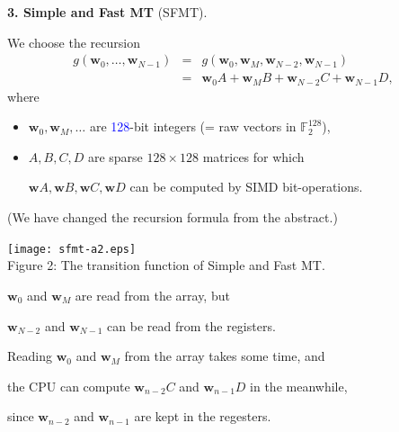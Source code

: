 \documentclass[a4j,12pt,landscape]{jarticle}
\def\F2{{\mathbb F}_2}
\def\bw{{{\mathbf w}}}
\begin{document}
\newpage
\noindent
{\bf 3. Simple and Fast MT} (SFMT).

We choose the recursion
\begin{eqnarray*}
g(\bw_0,\ldots,\bw_{N-1}) &=& g(\bw_0, \bw_M, \bw_{N-2}, \bw_{N-1}) \\
&=& \bw_0A + \bw_MB + \bw_{N-2}C + \bw_{N-1}D,
\end{eqnarray*}
where 
\begin{itemize}
\item
$\bw_0, \bw_M, \ldots$ are \textcolor{blue}{128}-bit integers 
(= raw vectors in $\F2^{128}$),

\item
$A, B, C, D$ are sparse $128 \times 128$ matrices
for which 

$\bw A, \bw B, \bw C, \bw D$ can be computed by
SIMD bit-operations.
\end{itemize}

(We have changed the recursion formula from the abstract.)
\newpage
\begin{center}
\texttt{[image: sfmt-a2.eps]}
\\
Figure 2: The transition function of Simple and Fast MT.

$\bw_0$ and $\bw_M$ are read from the array, but

$\bw_{N-2}$ and $\bw_{N-1}$ can be read from the registers.
\end{center}

\newpage
Reading $\bw_0$ and $\bw_M$ from the array takes some time, and 

the CPU can compute $\bw_{n-2}C$ and $\bw_{n-1}D$ in the meanwhile, 

since $\bw_{n-2}$ and $\bw_{n-1}$ are kept in the regesters.
\end{document}
